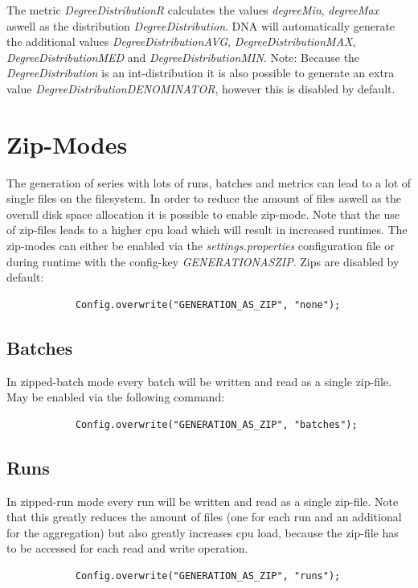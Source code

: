 The metric \textit{DegreeDistributionR} calculates the values \textit{degreeMin}, \textit{degreeMax} aswell as the distribution \textit{DegreeDistribution}. DNA will automatically generate the additional values \textit{DegreeDistribution\textunderscore AVG}, \textit{DegreeDistribution\textunderscore MAX}, \textit{DegreeDistribution\textunderscore MED} and \textit{DegreeDistribution\textunderscore MIN}. Note: Because the \textit{DegreeDistribution} is an int-distribution it is also possible to generate an extra value \textit{DegreeDistribution\textunderscore DENOMINATOR}, however this is disabled by default.

\section{Zip-Modes}
The generation of series with lots of runs, batches and metrics can lead to a lot of single files on the filesystem. In order to reduce the amount of files aswell as the overall disk space allocation it is possible to enable zip-mode. Note that the use of zip-files leads to a higher cpu load which will result in increased runtimes. The zip-modes can either be enabled via the \textit{settings.properties} configuration file or during runtime with the config-key \textit{GENERATION\textunderscore AS\textunderscore ZIP}. Zips are disabled by default:
\begin{lstlisting}
			Config.overwrite("GENERATION_AS_ZIP", "none");
\end{lstlisting}

\subsection{Batches}
In zipped-batch mode every batch will be written and read as a single zip-file. May be enabled via the following command:
\begin{lstlisting}
			Config.overwrite("GENERATION_AS_ZIP", "batches");
\end{lstlisting}

\subsection{Runs}
In zipped-run mode every run will be written and read as a single zip-file. Note that this greatly reduces the amount of files (one for each run and an additional for the aggregation) but also greatly increases cpu load, because the zip-file has to be accessed for each read and write operation.
\begin{lstlisting}
			Config.overwrite("GENERATION_AS_ZIP", "runs");
\end{lstlisting}